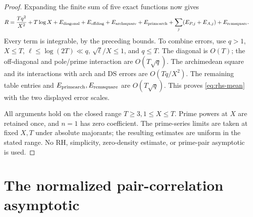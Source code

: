 \documentclass[11pt]{article}
\begin{document}
\begin{proof}
Expanding the finite sum of five exact functions now gives
\[
 R=\frac{Tq^2}{X^2}+T\log X+
 E_{\rm diagonal}+E_{\rm offdiag}+E_{\rm archsquare}
 +E_{\rm primearch}
 +\sum_j(E_{P,j}+E_{A,j})+E_{\rm remsquare}.
\]
Every term is integrable, by the preceding bounds. To combine errors,
use \(q>1\), \(X\leq T\), \(\ell\leq\log(2T)\ll q\),
\(\sqrt\ell/X\leq1\), and \(q\leq T\).
The diagonal is \(O(T)\); the off-diagonal and pole/prime
interaction are \(O(T\sqrt q)\).
The archimedean square and its interactions with arch and DS errors
are \(O(Tq/X^2)\). The remaining table entries and
\(E_{\rm primearch},E_{\rm remsquare}\) are \(O(T\sqrt q)\).
This proves \eqref{eq:rhs-mean} with the two displayed error scales.

All arguments hold on the closed range \(T\geq3,1\leq X\leq T\).
Prime powers at \(X\) are retained once, and \(n=1\) has zero
coefficient. The prime-series limits are taken at fixed \(X,T\)
under absolute majorants; the resulting estimates are uniform in
the stated range. No RH, simplicity, zero-density estimate, or
prime-pair asymptotic is used.
\end{proof}

\section{The normalized pair-correlation asymptotic}
\end{document}
